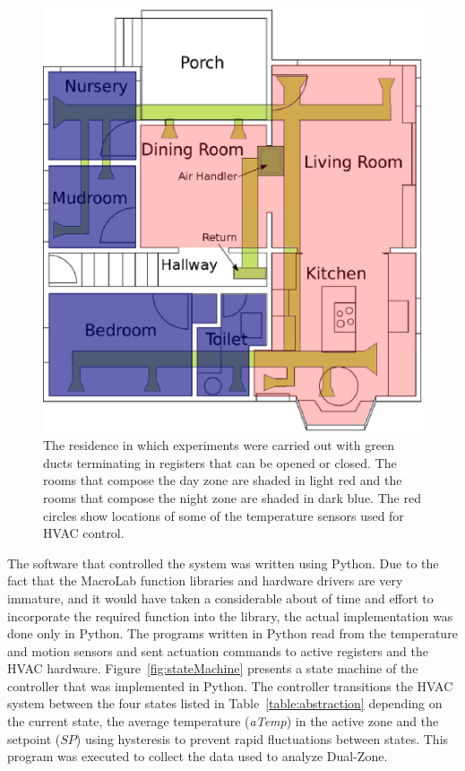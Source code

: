 \begin{figure}[ht]
  \centering
  \includegraphics[width=0.6\columnwidth]{fig/floorplan-mechanicalZoned.eps}
  \caption[The residential testbed used for zoning studies]{The residence in
  which experiments were carried out with green ducts terminating in registers
  that can be opened or closed. The rooms that compose the day zone are shaded
  in light red and the rooms that compose the night zone are shaded in dark
  blue. The red circles show locations of some of the temperature sensors used
  for HVAC control.}
  \label{fig:cs1Floorplan}
\end{figure}

The software that controlled the system was written using Python. Due to the
fact that the MacroLab function libraries and hardware drivers are very
immature, and it would have taken a considerable about of time and effort to
incorporate the required function into the library, the actual implementation
was done only in Python. The programs written in Python read from the
temperature and motion sensors and sent actuation commands to active registers
and the HVAC hardware. Figure~\ref{fig:stateMachine} presents a state machine of
the controller that was implemented in Python. The controller transitions the
HVAC system between the four states listed in Table~\ref{table:abstraction}
depending on the current state, the average temperature ({\em aTemp}) in the
active zone and the setpoint ($SP$) using hysteresis to prevent rapid
fluctuations between states. This program was executed to collect the data used
to analyze Dual-Zone.

